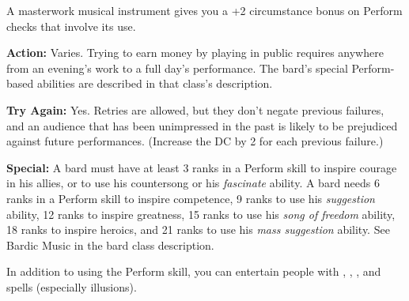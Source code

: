 A masterwork musical instrument gives you a +2 circumstance bonus on Perform checks 
that involve its use.

\textbf{Action:} Varies. Trying to earn money by playing in public requires anywhere 
from an evening's work to a full day's performance. The bard's special Perform-based 
abilities are described in that class's description.

\textbf{Try Again:} Yes. Retries are allowed, but they don't negate previous failures, 
and an audience that has been unimpressed in the past is likely to be prejudiced 
against future performances. (Increase the DC by 2 for each previous failure.)

\textbf{Special:} A bard must have at least 3 ranks in a Perform skill to inspire 
courage in his allies, or to use his countersong or his \textit{fascinate }ability. 
A bard needs 6 ranks in a Perform skill to inspire competence, 9 ranks to use his 
\textit{suggestion }ability, 12 ranks to inspire greatness, 15 ranks to use his 
\textit{song of freedom }ability, 18 ranks to inspire heroics, and 21 ranks to 
use his \textit{mass suggestion }ability. See Bardic Music in the bard class description.

In addition to using the Perform skill, you can entertain people with , , , and spells (especially illusions).
